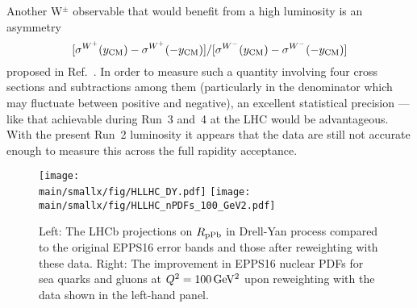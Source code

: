 \documentclass[../report.tex]{subfiles}
\providecommand{\main}{..}
\begin{document}

\noindent Another W$^\pm$ observable that would benefit from a high luminosity is an asymmetry $$[\sigma^{W^+}(y_{\rm CM})-\sigma^{W^+}(-y_{\rm CM})]/[\sigma^{W^-}(y_{\rm CM})-\sigma^{W^-}(-y_{\rm CM})]$$
proposed in Ref.~\cite{Paukkunen:2010qg}. In order to measure such a quantity involving four cross sections and subtractions among them (particularly in the denominator which may fluctuate between positive and negative), an excellent statistical precision --- like that achievable during Run~3 and~4 at the LHC would be advantageous. With the present Run~2 luminosity it appears that the data \cite{CMS:2018ilq} are still not accurate enough to measure this across the full rapidity acceptance.

%
\begin{figure}[htb!]
\centering
\texttt{[image: \\main/smallx/fig/HLLHC\_DY.pdf]}
\texttt{[image: \\main/smallx/fig/HLLHC\_nPDFs\_100\_GeV2.pdf]}
\caption{Left: The LHCb projections on $R_{\rm pPb}$ in  Drell-Yan process compared to the original EPPS16 error bands and those after reweighting with these data. Right: The improvement in EPPS16 nuclear PDFs for sea quarks and gluons at $Q^2=100\,{\rm GeV^2}$ upon reweighting with the data shown in the left-hand panel.}
\label{fig:DYRpPb}
\end{figure}
\end{document}
